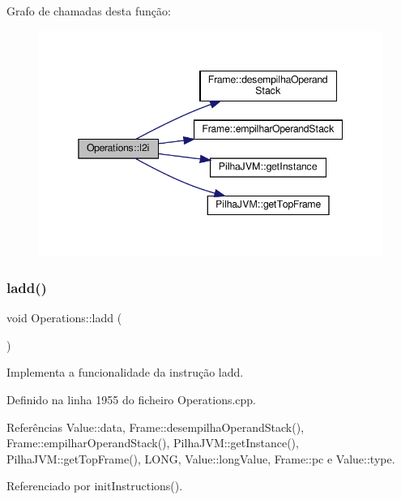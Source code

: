 Grafo de chamadas desta função\+:\nopagebreak
\begin{figure}[H]
\begin{center}
\leavevmode
\includegraphics[width=345pt]{classOperations_ad5820d99e67f4856e110685b775c5e9b_cgraph}
\end{center}
\end{figure}
\mbox{\label{classOperations_ad4b153d687baa98c26fcfe7c24e12f45}} 
\subsubsection{\texorpdfstring{ladd()}{ladd()}}
{\footnotesize\ttfamily void Operations\+::ladd (\begin{DoxyParamCaption}{ }\end{DoxyParamCaption})\hspace{0.3cm}{\ttfamily [private]}}



Implementa a funcionalidade da instrução ladd. 



Definido na linha 1955 do ficheiro Operations.\+cpp.



Referências Value\+::data, Frame\+::desempilha\+Operand\+Stack(), Frame\+::empilhar\+Operand\+Stack(), Pilha\+J\+V\+M\+::get\+Instance(), Pilha\+J\+V\+M\+::get\+Top\+Frame(), L\+O\+NG, Value\+::long\+Value, Frame\+::pc e Value\+::type.



Referenciado por init\+Instructions().

